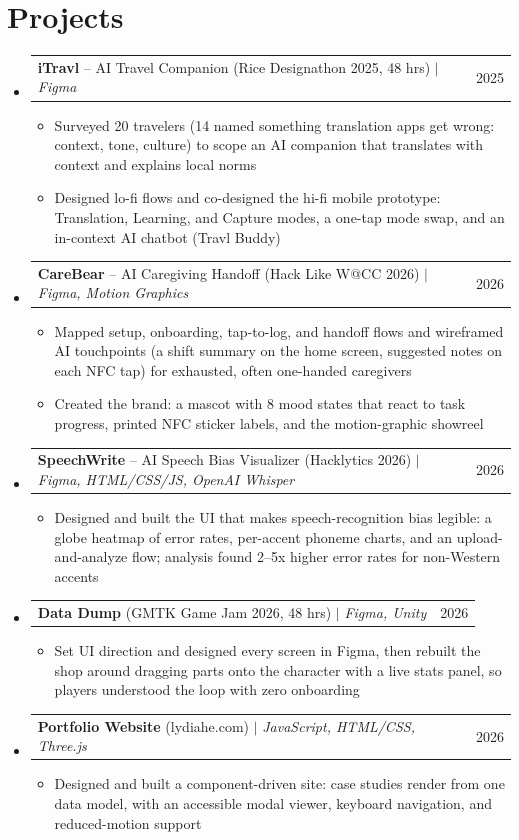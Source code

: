 \documentclass[letterpaper,11pt]{article}
\makeatletter
\newcommand{\resumeItem}[1]{
  \item\small{
    {#1 \vspace{-2pt}}
  }
}
\newcommand{\resumeProjectHeading}[2]{
    \item
    \begin{tabular*}{0.97\textwidth}{l@{\extracolsep{\fill}}r}
      \small#1 & #2 \\
    \end{tabular*}\vspace{-7pt}
}
\newcommand{\resumeSubHeadingListStart}{\begin{itemize}[leftmargin=0.15in, label={}]}
\newcommand{\resumeSubHeadingListEnd}{\end{itemize}}
\newcommand{\resumeItemListStart}{\begin{itemize}}
\newcommand{\resumeItemListEnd}{\end{itemize}\vspace{-5pt}}
\makeatother
\begin{document}
\section{Projects}
    \resumeSubHeadingListStart
      \resumeProjectHeading
          {\textbf{iTravl} -- AI Travel Companion (Rice Designathon 2025, 48 hrs) $|$ \emph{Figma}}{2025}
          \resumeItemListStart
            \resumeItem{Surveyed 20 travelers (14 named something translation apps get wrong: context, tone, culture) to scope an AI companion that translates with context and explains local norms}
            \resumeItem{Designed lo-fi flows and co-designed the hi-fi mobile prototype: Translation, Learning, and Capture modes, a one-tap mode swap, and an in-context AI chatbot (Travl Buddy)}
          \resumeItemListEnd
      \resumeProjectHeading
          {\textbf{CareBear} -- AI Caregiving Handoff (Hack Like W@CC 2026) $|$ \emph{Figma, Motion Graphics}}{2026}
          \resumeItemListStart
            \resumeItem{Mapped setup, onboarding, tap-to-log, and handoff flows and wireframed AI touchpoints (a shift summary on the home screen, suggested notes on each NFC tap) for exhausted, often one-handed caregivers}
            \resumeItem{Created the brand: a mascot with 8 mood states that react to task progress, printed NFC sticker labels, and the motion-graphic showreel}
          \resumeItemListEnd
      \resumeProjectHeading
          {\textbf{SpeechWrite} -- AI Speech Bias Visualizer (Hacklytics 2026) $|$ \emph{Figma, HTML/CSS/JS, OpenAI Whisper}}{2026}
          \resumeItemListStart
            \resumeItem{Designed and built the UI that makes speech-recognition bias legible: a globe heatmap of error rates, per-accent phoneme charts, and an upload-and-analyze flow; analysis found 2--5x higher error rates for non-Western accents}
          \resumeItemListEnd
      \resumeProjectHeading
          {\textbf{Data Dump} (GMTK Game Jam 2026, 48 hrs) $|$ \emph{Figma, Unity}}{2026}
          \resumeItemListStart
            \resumeItem{Set UI direction and designed every screen in Figma, then rebuilt the shop around dragging parts onto the character with a live stats panel, so players understood the loop with zero onboarding}
          \resumeItemListEnd
      \resumeProjectHeading
          {\textbf{Portfolio Website} (lydiahe.com) $|$ \emph{JavaScript, HTML/CSS, Three.js}}{2026}
          \resumeItemListStart
            \resumeItem{Designed and built a component-driven site: case studies render from one data model, with an accessible modal viewer, keyboard navigation, and reduced-motion support}
          \resumeItemListEnd
    \resumeSubHeadingListEnd
\end{document}

